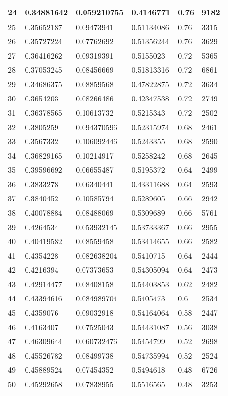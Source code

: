 \begin{longtable}{|l|l|l|l|l|l|}
24 & 0.34881642 & 0.059210755 & 0.4146771 & 0.76 & 9182 \\ \hline 
25 & 0.35652187 & 0.09473941 & 0.51134086 & 0.76 & 3315 \\ \hline 
26 & 0.35727224 & 0.07762692 & 0.51356244 & 0.76 & 3629 \\ \hline 
27 & 0.36416262 & 0.09319391 & 0.5155023 & 0.72 & 5365 \\ \hline 
28 & 0.37053245 & 0.08456669 & 0.51813316 & 0.72 & 6861 \\ \hline 
29 & 0.34686375 & 0.08859568 & 0.47822875 & 0.72 & 3634 \\ \hline 
30 & 0.3654203 & 0.08266486 & 0.42347538 & 0.72 & 2749 \\ \hline 
31 & 0.36378565 & 0.10613732 & 0.5215343 & 0.72 & 2502 \\ \hline 
32 & 0.3805259 & 0.094370596 & 0.52315974 & 0.68 & 2461 \\ \hline 
33 & 0.3567332 & 0.106092446 & 0.5243355 & 0.68 & 2590 \\ \hline 
34 & 0.36829165 & 0.10214917 & 0.5258242 & 0.68 & 2645 \\ \hline 
35 & 0.39596692 & 0.06655487 & 0.5195372 & 0.64 & 2499 \\ \hline 
36 & 0.3833278 & 0.06340441 & 0.43311688 & 0.64 & 2593 \\ \hline 
37 & 0.3840452 & 0.10585794 & 0.5289605 & 0.66 & 2942 \\ \hline 
38 & 0.40078884 & 0.08488069 & 0.5309689 & 0.66 & 5761 \\ \hline 
39 & 0.4264534 & 0.053932145 & 0.53733367 & 0.66 & 2955 \\ \hline 
40 & 0.40419582 & 0.08559458 & 0.53414655 & 0.66 & 2582 \\ \hline 
41 & 0.4354228 & 0.082638204 & 0.5410715 & 0.64 & 2444 \\ \hline 
42 & 0.4216394 & 0.07373653 & 0.54305094 & 0.64 & 2473 \\ \hline 
43 & 0.42914477 & 0.08408158 & 0.54403853 & 0.62 & 2482 \\ \hline 
44 & 0.43394616 & 0.084989704 & 0.5405473 & 0.6 & 2534 \\ \hline 
45 & 0.4359076 & 0.09032918 & 0.54164064 & 0.58 & 2447 \\ \hline 
46 & 0.4163407 & 0.07525043 & 0.54431087 & 0.56 & 3038 \\ \hline 
47 & 0.46309644 & 0.060732476 & 0.5454799 & 0.52 & 2698 \\ \hline 
48 & 0.45526782 & 0.08499738 & 0.54735994 & 0.52 & 2524 \\ \hline 
49 & 0.45889524 & 0.07454352 & 0.5494618 & 0.48 & 6726 \\ \hline 
50 & 0.45292658 & 0.07838955 & 0.5516565 & 0.48 & 3253 \\ \hline 
\end{longtable}